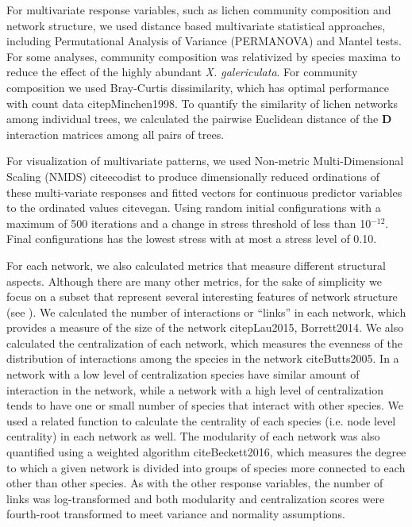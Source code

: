 \documentclass[11pt,twocolumn,twoside,lineno]{pnas-new}
\begin{document}
{For multivariate response variables, such as lichen community
composition and network structure, we used distance based multivariate
statistical approaches, including Permutational Analysis of Variance
(PERMANOVA) and Mantel tests. For some analyses, community composition
was relativized by species maxima to reduce the effect of the highly
abundant \textit{X. galericulata}. For community composition we used
Bray-Curtis dissimilarity, which has optimal performance with count
data citep{Minchen1998}. To quantify the similarity of lichen
networks among individual trees, we calculated the pairwise Euclidean
distance of the $\mathbf{D}$ interaction matrices among all pairs of
trees.

For visualization of multivariate patterns, we used Non-metric
Multi-Dimensional Scaling (NMDS) cite{ecodist} to produce
dimensionally reduced ordinations of these multi-variate responses and
fitted vectors for continuous predictor variables to the ordinated
values cite{vegan}. Using random initial configurations with a
maximum of 500 iterations and a change in stress threshold of less
than 10$^{-12}$. Final configurations has the lowest stress with at
most a stress level of 0.10.


For each network, we also calculated metrics that measure different
structural aspects. Although there are many other metrics, for the
sake of simplicity we focus on a subset that represent several
interesting features of network structure (see \citep{Lau2017a}). We
calculated the number of interactions or ``links'' in each network,
which provides a measure of the size of the network citep{Lau2015,
  Borrett2014}. We also calculated the centralization of each network,
which measures the evenness of the distribution of interactions among
the species in the network cite{Butts2005}. In a network with a low
level of centralization species have similar amount of interaction in
the network, while a network with a high level of centralization tends
to have one or small number of species that interact with other
species. We used a related function to calculate the centrality of
each species (i.e. node level centrality) in each network as well. The
modularity of each network was also quantified using a weighted
algorithm cite{Beckett2016}, which measures the degree to which a
given network is divided into groups of species more connected to each
other than other species. As with the other response variables, the
number of links was log-transformed and both modularity and
centralization scores were fourth-root transformed to meet variance
and normality assumptions.

}
\end{document}
